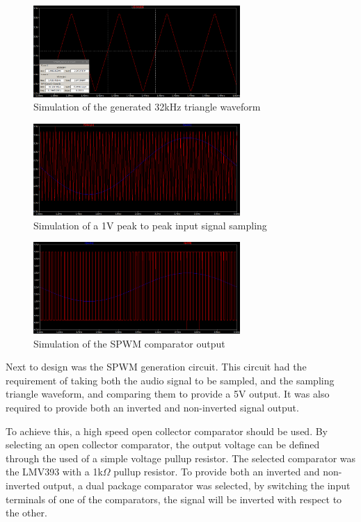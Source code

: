 \documentclass[a4paper,11pt]{article}
\begin{document}
\begin{figure}[h!]
    \centering
    \includegraphics[width=0.7\textwidth]{simulation/triangle_wave.png}
    \caption{Simulation of the generated 32kHz triangle waveform}
    \label{F:triangle}
\end{figure}

\begin{figure}[h!]
    \centering
    \includegraphics[width=0.7\textwidth]{simulation/sampling.png}
    \caption{Simulation of a 1V peak to peak input signal sampling}
    \label{F:sampling}
\end{figure}

\begin{figure}[h!]
    \centering
    \includegraphics[width=0.7\textwidth]{simulation/spwm_out.png}
    \caption{Simulation of the SPWM comparator output}
    \label{F:SPWM}
\end{figure}

Next to design was the SPWM generation circuit. This circuit had the requirement of taking both the audio signal to be sampled, and the sampling triangle waveform, and comparing them to provide a 5V output. It was also required to provide both an inverted and non-inverted signal output.

To achieve this, a high speed open collector comparator should be used. By selecting an open collector comparator, the output voltage can be defined through the used of a simple voltage pullup resistor. The selected comparator was the LMV393 with a 1k$\Omega$ pullup resistor. To provide both an inverted and non-inverted output, a dual package comparator was selected, by switching the input terminals of one of the comparators, the signal will be inverted with respect to the other.\\
\end{document}
